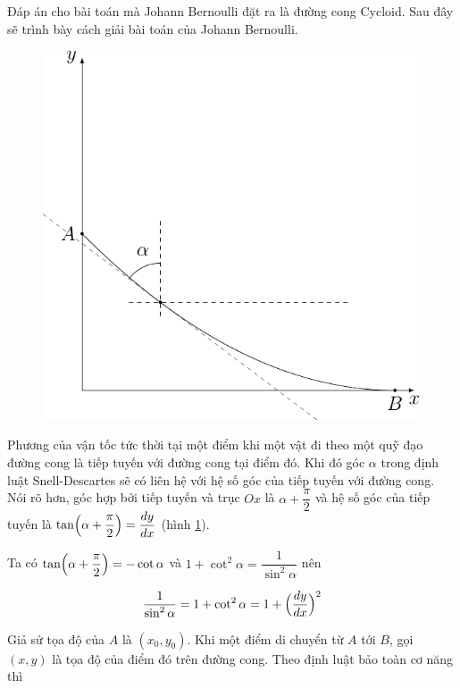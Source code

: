 \documentclass{article}
\begin{document}
Đáp án cho bài toán mà Johann Bernoulli đặt ra là đường cong Cycloid. Sau đây sẽ trình bày cách giải bài toán của Johann Bernoulli.

\begin{figure}[ht]
	\centering
	\includegraphics{brachistochrone.pdf}
	\label{cycloid:im1}
\end{figure}

Phương của vận tốc tức thời tại một điểm khi một vật đi theo một quỹ đạo đường cong là tiếp tuyến với đường cong tại điểm đó. Khi đó góc $\alpha$ trong định luật Snell-Descartes sẽ có liên hệ với hệ số góc của tiếp tuyến với đường cong. Nói rõ hơn, góc hợp bởi tiếp tuyến và trục $Ox$ là $\alpha + \dfrac{\pi}{2}$ và hệ số góc của tiếp tuyến là $\tan \Bigl(\alpha + \dfrac{\pi}{2}\Bigr) = \dfrac{dy}{dx}$ (hình \ref{cycloid:im1}).

Ta có $\tan \Bigl( \alpha + \dfrac{\pi}{2} \Bigr) = -\cot \alpha$ và $1 + \cot^2 \alpha = \dfrac{1}{\sin^2 \alpha}$ nên 

\begin{equation}
	\dfrac{1}{\sin^2 \alpha} = 1 + \cot^2 \alpha = 1 + \Bigl(\dfrac{dy}{dx}\Bigl)^2
\end{equation}

Giả sử tọa độ của $A$ là $(x_0, y_0)$. Khi một điểm di chuyển từ $A$ tới $B$, gọi $(x, y)$ là tọa độ của điểm đó trên đường cong. Theo định luật bảo toàn cơ năng thì 
\end{document}
